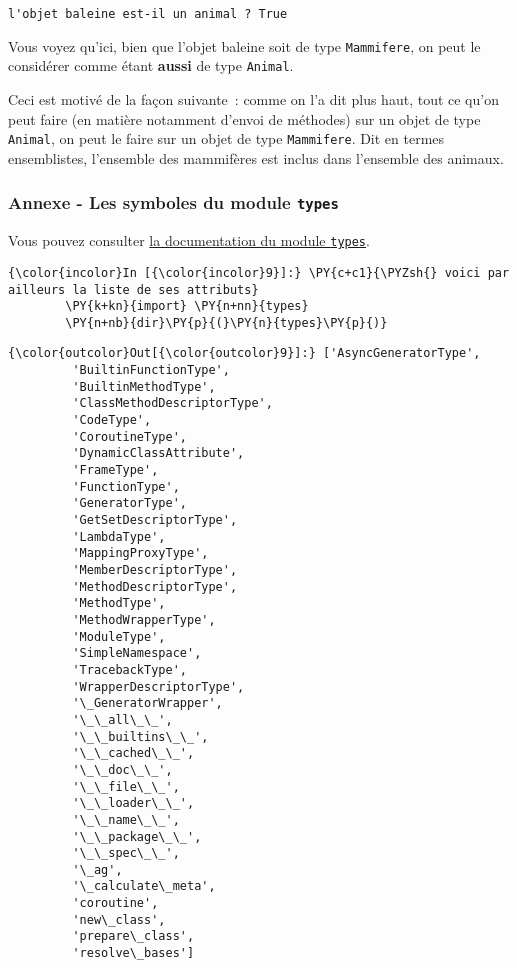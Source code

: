     \begin{Verbatim}[commandchars=\\\{\}]
l'objet baleine est-il un animal ? True

    \end{Verbatim}

    Vous voyez qu'ici, bien que l'objet baleine soit de type
\texttt{Mammifere}, on peut le considérer comme étant \textbf{aussi} de
type \texttt{Animal}.

Ceci est motivé de la façon suivante~: comme on l'a dit plus haut, tout
ce qu'on peut faire (en matière notamment d'envoi de méthodes) sur un
objet de type \texttt{Animal}, on peut le faire sur un objet de type
\texttt{Mammifere}. Dit en termes ensemblistes, l'ensemble des
mammifères est inclus dans l'ensemble des animaux.

    \hypertarget{annexe---les-symboles-du-module-types}{%
\subsubsection{\texorpdfstring{Annexe - Les symboles du module
\texttt{types}}{Annexe - Les symboles du module types}}\label{annexe---les-symboles-du-module-types}}

    Vous pouvez consulter
\href{https://docs.python.org/3/library/types.html}{la documentation du
module \texttt{types}}.

    \begin{Verbatim}[commandchars=\\\{\}]
{\color{incolor}In [{\color{incolor}9}]:} \PY{c+c1}{\PYZsh{} voici par ailleurs la liste de ses attributs}
        \PY{k+kn}{import} \PY{n+nn}{types} 
        \PY{n+nb}{dir}\PY{p}{(}\PY{n}{types}\PY{p}{)}
\end{Verbatim}


\begin{Verbatim}[commandchars=\\\{\}]
{\color{outcolor}Out[{\color{outcolor}9}]:} ['AsyncGeneratorType',
         'BuiltinFunctionType',
         'BuiltinMethodType',
         'ClassMethodDescriptorType',
         'CodeType',
         'CoroutineType',
         'DynamicClassAttribute',
         'FrameType',
         'FunctionType',
         'GeneratorType',
         'GetSetDescriptorType',
         'LambdaType',
         'MappingProxyType',
         'MemberDescriptorType',
         'MethodDescriptorType',
         'MethodType',
         'MethodWrapperType',
         'ModuleType',
         'SimpleNamespace',
         'TracebackType',
         'WrapperDescriptorType',
         '\_GeneratorWrapper',
         '\_\_all\_\_',
         '\_\_builtins\_\_',
         '\_\_cached\_\_',
         '\_\_doc\_\_',
         '\_\_file\_\_',
         '\_\_loader\_\_',
         '\_\_name\_\_',
         '\_\_package\_\_',
         '\_\_spec\_\_',
         '\_ag',
         '\_calculate\_meta',
         'coroutine',
         'new\_class',
         'prepare\_class',
         'resolve\_bases']
\end{Verbatim}
            

    
    
    
